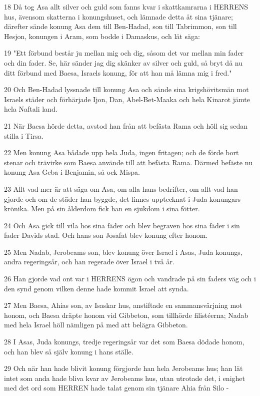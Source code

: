 \par 18 Då tog Asa allt silver och guld som fanns kvar i skattkamrarna i HERRENS hus, ävensom skatterna i konungshuset, och lämnade detta åt sina tjänare; därefter sände konung Asa dem till Ben-Hadad, son till Tabrimmon, son till Hesjon, konungen i Aram, som bodde i Damaskus, och lät säga:
\par 19 "Ett förbund består ju mellan mig och dig, såsom det var mellan min fader och din fader. Se, här sänder jag dig skänker av silver och guld, så bryt då nu ditt förbund med Baesa, Israels konung, för att han må lämna mig i fred."
\par 20 Och Ben-Hadad lyssnade till konung Asa och sände sina krigshövitsmän mot Israels städer och förhärjade Ijon, Dan, Abel-Bet-Maaka och hela Kinarot jämte hela Naftali land.
\par 21 När Baesa hörde detta, avstod han från att befästa Rama och höll sig sedan stilla i Tirsa.
\par 22 Men konung Asa bådade upp hela Juda, ingen fritagen; och de förde bort stenar och trävirke som Baesa använde till att befästa Rama. Därmed befäste nu konung Asa Geba i Benjamin, så ock Mispa.
\par 23 Allt vad mer är att säga om Asa, om alla hans bedrifter, om allt vad han gjorde och om de städer han byggde, det finnes upptecknat i Juda konungars krönika. Men på sin ålderdom fick han en sjukdom i sina fötter.
\par 24 Och Asa gick till vila hos sina fäder och blev begraven hos sina fäder i sin fader Davids stad. Och hans son Josafat blev konung efter honom.
\par 25 Men Nadab, Jerobeams son, blev konung över Israel i Asas, Juda konungs, andra regeringsår, och han regerade över Israel i två år.
\par 26 Han gjorde vad ont var i HERRENS ögon och vandrade på sin faders väg och i den synd genom vilken denne hade kommit Israel att synda.
\par 27 Men Baesa, Ahias son, av Isaskar hus, anstiftade en sammansvärjning mot honom, och Baesa dräpte honom vid Gibbeton, som tillhörde filistéerna; Nadab med hela Israel höll nämligen på med att belägra Gibbeton.
\par 28 I Asas, Juda konungs, tredje regeringsår var det som Baesa dödade honom, och han blev så själv konung i hans ställe.
\par 29 Och när han hade blivit konung förgjorde han hela Jerobeams hus; han lät intet som anda hade bliva kvar av Jerobeams hus, utan utrotade det, i enighet med det ord som HERREN hade talat genom sin tjänare Ahia från Silo -
